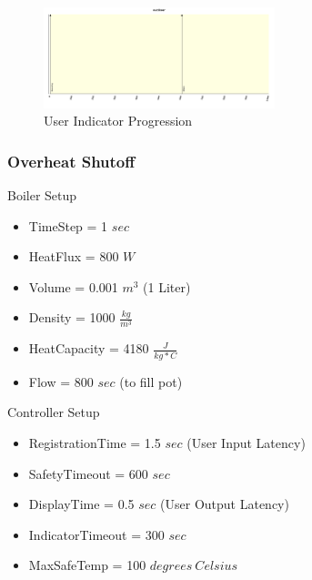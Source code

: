\documentclass[10pt]{article}
\begin{document}
\begin{center}
  \begin{figure}[H]
    \begin{center}
      \includegraphics[width=0.6\textwidth]{input/test-2-plot}
      \caption{User Indicator Progression}
      \label{ref:test-2-plot}
    \end{center}
  \end{figure}
\end{center}


\subsubsection{Overheat Shutoff}
\begin{multicols}{2}
Boiler Setup
\begin{itemize}
\item TimeStep = 1 $sec$
\item HeatFlux = 800 $W$
\item Volume = 0.001 $m^3$ (1 Liter)
\item Density = 1000 $\frac{kg}{m^3}$
\item HeatCapacity = 4180 $\frac{J}{kg*C}$
\item Flow = 800 $sec$ (to fill pot)
\end{itemize}

\columnbreak
Controller Setup
\begin{itemize}
\item RegistrationTime = 1.5 $sec$ (User Input Latency)
\item SafetyTimeout = 600 $sec$
\item DisplayTime = 0.5 $sec$ (User Output Latency)
\item IndicatorTimeout = 300 $sec$
\item MaxSafeTemp = 100 $degrees~Celsius$
\end{itemize}

\end{multicols}
\end{document}
